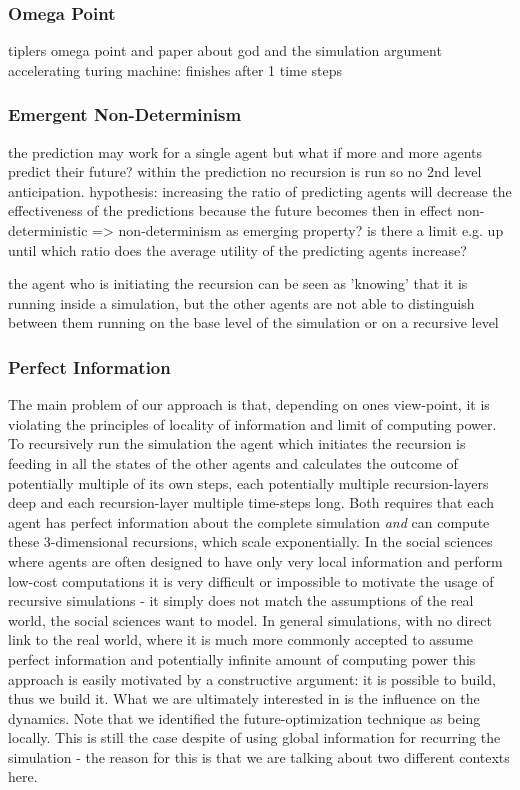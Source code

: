 \subsubsection{Omega Point}
tiplers omega point and paper about god and the simulation argument
accelerating turing machine: finishes after 1 time steps

\subsubsection{Emergent Non-Determinism}
the prediction may work for a single agent but what if more and more agents predict their future? within the prediction no recursion is run so no 2nd level anticipation. 
hypothesis: increasing the ratio of predicting agents will decrease the effectiveness of the predictions because the future becomes then in effect non-deterministic => non-determinism as emerging property? is there a limit e.g. up until which ratio does the average utility of the predicting agents increase?

the agent who is initiating the recursion can be seen as 'knowing' that it is running inside a simulation, but the other agents are not able to distinguish between them running on the base level of the simulation or on a recursive level

\subsubsection{Perfect Information}
The main problem of our approach is that, depending on ones view-point, it is violating the principles of locality of information and limit of computing power. To recursively run the simulation the agent which initiates the recursion is feeding in all the states of the other agents and calculates the outcome of potentially multiple of its own steps, each potentially multiple recursion-layers deep and each recursion-layer multiple time-steps long. Both requires that each agent has perfect information about the complete simulation \textit{and} can compute these 3-dimensional recursions, which scale exponentially.
In the social sciences where agents are often designed to have only very local information and perform low-cost computations it is very difficult or impossible to motivate the usage of recursive simulations - it simply does not match the assumptions of the real world, the social sciences want to model.
In general simulations, with no direct link to the real world, where it is much more commonly accepted to assume perfect information and potentially infinite amount of computing power this approach is easily motivated by a constructive argument: it is possible to build, thus we build it.
What we are ultimately interested in is the influence on the dynamics.
Note that we identified the future-optimization technique as being locally. This is still the case despite of using global information for recurring the simulation - the reason for this is that we are talking about two different contexts here.


